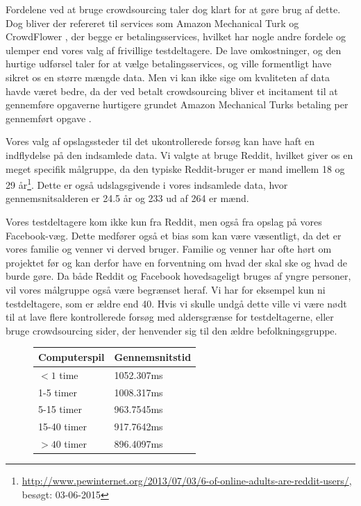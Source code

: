 Fordelene ved at bruge crowdsourcing taler dog klart for at gøre brug af dette. Dog bliver der refereret til services som Amazon Mechanical Turk og CrowdFlower \cite{liu2012crowdsourcing}, der begge er betalingsservices, hvilket har nogle andre fordele og ulemper end vores valg af frivillige testdeltagere. De lave omkostninger, og den hurtige udførsel taler for at vælge betalingsservices, og ville formentligt have sikret os en større mængde data. Men vi kan ikke sige om kvaliteten af data havde været bedre, da der ved betalt crowdsourcing bliver et incitament til at gennemføre opgaverne hurtigere grundet Amazon Mechanical Turks betaling per gennemført opgave \cite{liu2012crowdsourcing}.

Vores valg af opslagssteder til det ukontrollerede forsøg kan have haft en indflydelse på den indsamlede data. Vi valgte at bruge Reddit, hvilket giver os en meget specifik målgruppe, da den typiske Reddit-bruger er mand imellem 18 og 29 år\footnote{\url{http://www.pewinternet.org/2013/07/03/6-of-online-adults-are-reddit-users/}, besøgt: 03-06-2015}. Dette er også udslagsgivende i vores indsamlede data, hvor gennemsnitsalderen er 24.5 år og 233 ud af 264 er mænd.

Vores testdeltagere kom ikke kun fra Reddit, men også fra opslag på vores Facebook-væg. Dette medfører også et bias som kan være væsentligt, da det er vores familie og venner vi derved bruger. Familie og venner har ofte hørt om projektet før og kan derfor have en forventning om hvad der skal ske og hvad de burde gøre. Da både Reddit og Facebook hovedsageligt bruges af yngre personer, vil vores målgruppe også være begrænset heraf. Vi har for eksempel kun ni testdeltagere, som er ældre end 40. Hvis vi skulle undgå dette ville vi være nødt til at lave flere kontrollerede forsøg med aldersgrænse for testdeltagerne, eller bruge crowdsourcing sider, der henvender sig til den ældre befolkningsgruppe.

\begin{figure}
	\centering
	\begin{tabular}{ll}
		\textbf{Computerspil} & \textbf{Gennemsnitstid}\\\hline
		$<1$ time    & 1052.307ms\\
		1-5 timer    & 1008.317ms\\
		5-15 timer   & 963.7545ms\\
		15-40 timer  & 917.7642ms\\
		$>40$ timer  & 896.4097ms\\
	\end{tabular}
	\label{tab:times_average}
\end{figure}

